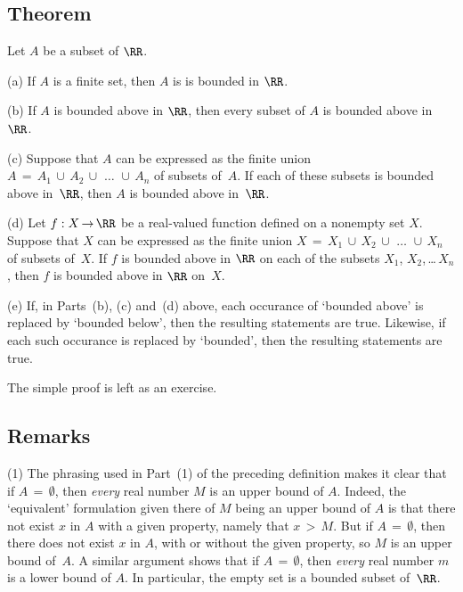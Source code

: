             \subsection{\small{\bf Theorem}}
            \label{ThmB20.195B}

\V

        Let $A$ be a subset of ${\RR}$.

\V

        (a) If $A$ is a finite set, then $A$ is is bounded in ${\RR}$.

\V

        (b) If $A$ is bounded above in ${\RR}$, then every subset of $A$ is bounded above in~${\RR}$.

\V

        (c) Suppose that $A$ can be expressed as the finite union $A \,=\, A_{1}\,{\cup}\,A_{2}\,{\cup}\,\,{\ldots}\,\,{\cup}\,A_{n}$ of subsets of~$A$.
    If each of these subsets is bounded above in~${\RR}$, then $A$ is bounded above in~${\RR}$.

\V

        (d) Let $f:X \,{\rightarrow}\, {\RR}$ be a real-valued function defined on a nonempty set $X$.
    Suppose that $X$ can be expressed as the finite union $X \,=\, X_{1}\,{\cup}\,X_{2}\,{\cup}\,\,{\ldots}\,\,{\cup}\,X_{n}$ of subsets of~$X$.
    If $f$ is bounded above in ${\RR}$ on each of the subsets $X_{1}$, $X_{2}$,\,{\ldots}\,$X_{n}$, then $f$ is bounded above in ${\RR}$ on~$X$.

\V

        (e) If, in Parts~(b), (c) and~(d) above, each occurance of `bounded above' is replaced by `bounded below', then the resulting statements are true.
    Likewise, if each such occurance is replaced by `bounded', then the resulting statements are true.

\V

        The simple proof is left as an exercise. %

\V

                    \subsection{\small{{\bf Remarks}}}
                    \label{RemrkB20.195BB}

\V

\hspace*{\parindent} (1) The phrasing used in Part~(1) of the preceding definition makes it clear that if $A \,=\, {\emptyset}$, then {\em every} real number $M$ is an upper bound of $A$.
    Indeed, the `equivalent' formulation given there of $M$ being an upper bound of $A$ is that there not exist $x$ in $A$ with a given property,
    namely that $x\,>\,M$. But if $A \,=\, {\emptyset}$, then there does not exist $x$ in $A$, with or without the given property, so $M$ is an upper bound of~$A$.
    A similar argument shows that if $A \,=\, {\emptyset}$, then {\em every} real number $m$ is a lower bound of $A$. In particular, the empty set is a bounded subset of~${\RR}$.

